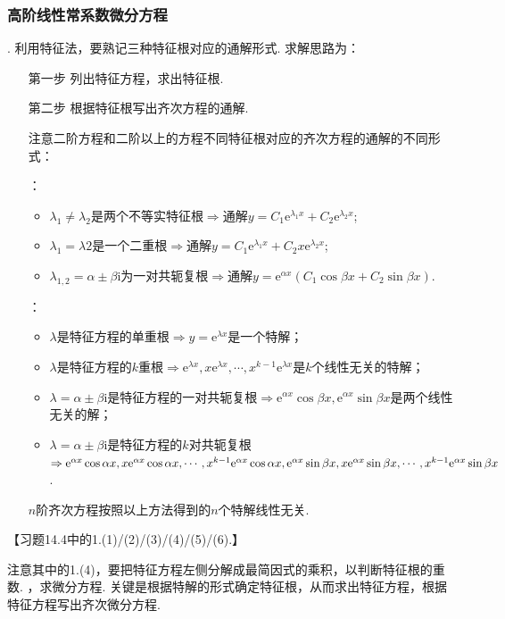 \documentclass[12pt,UTF8,fleqn]{ctexart}
\newcommand{\me}[0]{\mathrm e}
\newcommand{\m}[0]{\mathrm }
\begin{document}
\subsubsection{高阶线性常系数微分方程}
\begin{enumerate}
. 利用特征法，要熟记三种特征根对应的通解形式. 求解思路为：
\begin{enumerate}
\item[第一步]列出特征方程，求出特征根.
\item[第二步]根据特征根写出齐次方程的通解.

注意二阶方程和二阶以上的方程不同特征根对应的齐次方程的通解的不同形式：
\begin{enumerate}
：
\begin{itemize}
\item$\lambda_1\neq\lambda_2$是两个不等实特征根$\Rightarrow$通解$y=C_1\me^{\lambda_1x}+C_2\me^{\lambda_2x}$;
\item$\lambda_1=\lambda2$是一个二重根$\Rightarrow$通解$y=C_1\me^{\lambda_1x}+C_2x\me^{\lambda_2x}$;
\item$\lambda_{1,2}=\alpha\pm\beta\m i$为一对共轭复根$\Rightarrow$通解$y=\me^{\alpha x}(C_1\cos\beta x+C_2\sin\beta x)$.
\end{itemize}
：
\begin{itemize}
\item$\lambda$是特征方程的单重根$\Rightarrow y=\me^{\lambda x}$是一个特解；
\item$\lambda$是特征方程的$k$重根$\Rightarrow \me^{\lambda x},x\me^{\lambda x},\cdots,x^{k-1}\me^{\lambda x}$是$k$个线性无关的特解；
\item$\lambda=\alpha\pm\beta\m i$是特征方程的一对共轭复根$\Rightarrow\me^{\alpha x}\cos\beta x,\me^{\alpha x}\sin\beta x$是两个线性无关的解；
\item$\lambda=\alpha\pm\beta\m i$是特征方程的$k$对共轭复根\\
$\Rightarrow \me^{\alpha x}\cos\alpha x,x\me^{\alpha x}\cos\alpha x,\cdots,x^{k-1}\me^{\alpha x}\cos\alpha x,\\\me^{\alpha x}\sin\beta x,x\me^{\alpha x}\sin\beta x,\cdots,x^{k-1}\me^{\alpha x}\sin\beta x$.
\end{itemize}
$n$阶齐次方程按照以上方法得到的$n$个特解线性无关.
\end{enumerate}
\end{enumerate}

【习题14.4中的1.(1)/(2)/(3)/(4)/(5)/(6).】

注意其中的1.(4)，要把特征方程左侧分解成最简因式的乘积，以判断特征根的重数.
，求微分方程. 关键是根据特解的形式确定特征根，从而求出特征方程，根据特征方程写出齐次微分方程.


\end{enumerate}
\end{document}
